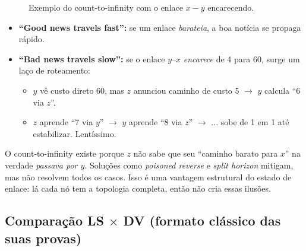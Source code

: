 \documentclass[11pt,a4paper]{article}
\begin{document}
\begin{figure}[h!]
\centering
{}
\caption{Exemplo do count-to-infinity com o enlace $x-y$ encarecendo.}
\label{fig:count_to_infinity}
\end{figure}

\begin{itemize}
    \item \textbf{``Good news travels fast'':} se um enlace \textit{barateia}, a boa notícia se propaga rápido.
    \item \textbf{``Bad news travels slow'':} se o enlace $y$–$x$ \textit{encarece} de 4 para 60, surge um laço de roteamento:
    \begin{itemize}
        \item $y$ vê custo direto 60, mas $z$ anunciou caminho de custo 5 $\to$ $y$ calcula ``6 via $z$''.
        \item $z$ aprende ``7 via $y$'' $\to$ $y$ aprende ``8 via $z$'' $\to$ ... sobe de 1 em 1 até estabilizar. Lentíssimo.
    \end{itemize}
\end{itemize}

\begin{reflexao}
O count-to-infinity existe porque $z$ não sabe que seu ``caminho barato para $x$'' na verdade \textit{passava por $y$}. Soluções como \textit{poisoned reverse} e \textit{split horizon} mitigam, mas não resolvem todos os casos. Isso é uma vantagem estrutural do estado de enlace: lá cada nó tem a topologia completa, então não cria essas ilusões.
\end{reflexao}

\hrulefill

\subsection{Comparação LS $\times$ DV (formato clássico das suas provas)}
\end{document}
